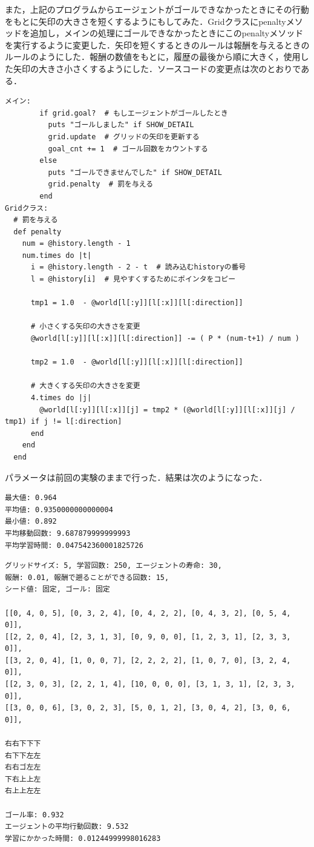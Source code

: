 \documentclass[a4j,11pt]{jarticle}
\begin{document}
また，上記のプログラムからエージェントがゴールできなかったときにその行動をもとに矢印の大きさを短くするようにもしてみた．Gridクラスにpenaltyメソッドを追加し，メインの処理にゴールできなかったときにこのpenaltyメソッドを実行するように変更した．矢印を短くするときのルールは報酬を与えるときのルールのようにした．報酬の数値をもとに，履歴の最後から順に大きく，使用した矢印の大きさ小さくするようにした．ソースコードの変更点は次のとおりである．

\begin{verbatim}
メイン:
        if grid.goal?  # もしエージェントがゴールしたとき
          puts "ゴールしました" if SHOW_DETAIL
          grid.update  # グリッドの矢印を更新する
          goal_cnt += 1  # ゴール回数をカウントする
        else
          puts "ゴールできませんでした" if SHOW_DETAIL
          grid.penalty  # 罰を与える
        end
Gridクラス:
  # 罰を与える
  def penalty
    num = @history.length - 1
    num.times do |t|
      i = @history.length - 2 - t  # 読み込むhistoryの番号
      l = @history[i]  # 見やすくするためにポインタをコピー

      tmp1 = 1.0  - @world[l[:y]][l[:x]][l[:direction]]

      # 小さくする矢印の大きさを変更
      @world[l[:y]][l[:x]][l[:direction]] -= ( P * (num-t+1) / num )

      tmp2 = 1.0  - @world[l[:y]][l[:x]][l[:direction]]

      # 大きくする矢印の大きさを変更
      4.times do |j|
        @world[l[:y]][l[:x]][j] = tmp2 * (@world[l[:y]][l[:x]][j] / tmp1) if j != l[:direction]
      end
    end
  end
\end{verbatim}

パラメータは前回の実験のままで行った．結果は次のようになった．

\begin{verbatim}
最大値: 0.964
平均値: 0.9350000000000004
最小値: 0.892
平均移動回数: 9.687879999999993
平均学習時間: 0.047542360001825726
\end{verbatim}

\begin{verbatim}
グリッドサイズ: 5, 学習回数: 250, エージェントの寿命: 30,
報酬: 0.01, 報酬で遡ることができる回数: 15,
シード値: 固定, ゴール: 固定

[[0, 4, 0, 5], [0, 3, 2, 4], [0, 4, 2, 2], [0, 4, 3, 2], [0, 5, 4, 0]],
[[2, 2, 0, 4], [2, 3, 1, 3], [0, 9, 0, 0], [1, 2, 3, 1], [2, 3, 3, 0]],
[[3, 2, 0, 4], [1, 0, 0, 7], [2, 2, 2, 2], [1, 0, 7, 0], [3, 2, 4, 0]],
[[2, 3, 0, 3], [2, 2, 1, 4], [10, 0, 0, 0], [3, 1, 3, 1], [2, 3, 3, 0]],
[[3, 0, 0, 6], [3, 0, 2, 3], [5, 0, 1, 2], [3, 0, 4, 2], [3, 0, 6, 0]],

右右下下下
右下下左左
右右ゴ左左
下右上上左
右上上左左

ゴール率: 0.932
エージェントの平均行動回数: 9.532
学習にかかった時間: 0.01244999998016283
\end{verbatim}
\end{document}
